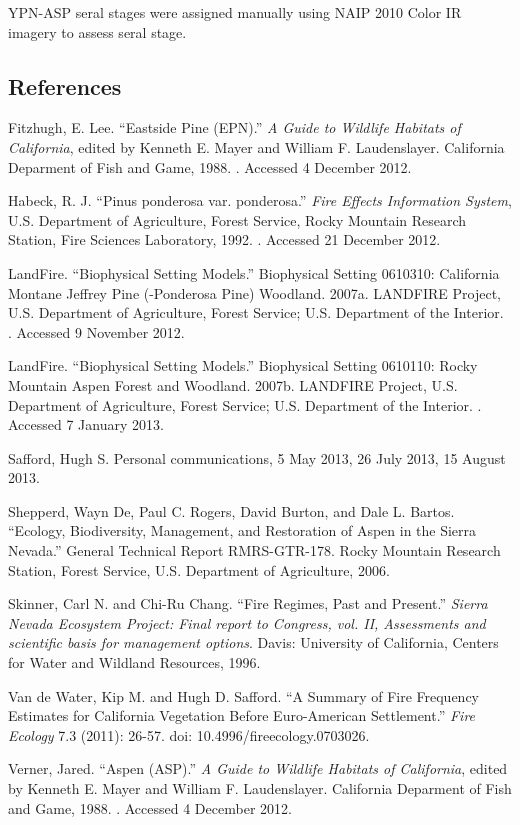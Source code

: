 YPN-ASP seral stages were assigned manually using NAIP 2010 Color IR imagery to assess seral stage.



\clearpage

\subsection*{References}
\begin{hangparas}{.25in}{1} 
Fitzhugh, E. Lee. ``Eastside Pine (EPN).'' \emph{A Guide to Wildlife Habitats of California}, edited by Kenneth E. Mayer and William F. Laudenslayer. California Deparment of Fish and Game, 1988. . Accessed 4 December 2012.

Habeck, R. J. ``Pinus ponderosa var. ponderosa.'' \emph{Fire Effects Information System}, U.S. Department of Agriculture, Forest Service,  Rocky Mountain Research Station, Fire Sciences Laboratory, 1992. . Accessed 21 December 2012.

LandFire. ``Biophysical Setting Models.'' Biophysical Setting 0610310: California Montane Jeffrey Pine (-Ponderosa Pine) Woodland. 2007a. LANDFIRE Project, U.S. Department of Agriculture, Forest Service; U.S. Department of the Interior. . Accessed 9 November 2012.

LandFire. ``Biophysical Setting Models.'' Biophysical Setting 0610110: Rocky Mountain Aspen Forest and Woodland. 2007b. LANDFIRE Project, U.S. Department of Agriculture, Forest Service; U.S. Department of the Interior. . Accessed 7 January 2013.

Safford, Hugh S. Personal communications, 5 May 2013, 26 July 2013, 15 August 2013.

Shepperd, Wayn De, Paul C. Rogers, David Burton, and Dale L. Bartos. ``Ecology, Biodiversity, Management, and Restoration of Aspen in the Sierra Nevada.'' General Technical Report RMRS-GTR-178. Rocky Mountain Research Station, Forest Service, U.S. Department of Agriculture, 2006.

Skinner, Carl N. and Chi-Ru Chang. ``Fire Regimes, Past and Present.'' \emph{Sierra Nevada Ecosystem Project: Final report to Congress, vol. II, Assessments and scientific basis for management options}. Davis: University of California, Centers for Water and Wildland Resources, 1996.

Van de Water, Kip M. and Hugh D. Safford. ``A Summary of Fire Frequency Estimates for California Vegetation Before Euro-American Settlement.'' \emph{Fire Ecology} 7.3 (2011): 26-57. doi: 10.4996/fireecology.0703026.

Verner, Jared. ``Aspen (ASP).'' \emph{A Guide to Wildlife Habitats of California}, edited by Kenneth E. Mayer and William F. Laudenslayer. California Deparment of Fish and Game, 1988. . Accessed 4 December 2012.

\end{hangparas}

